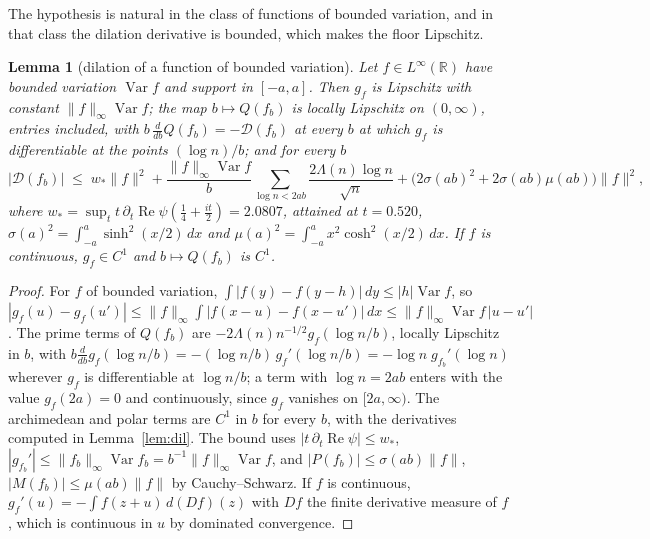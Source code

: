 \documentclass[11pt]{article}
\newtheorem{lemma}[theorem]{Lemma}
\theoremstyle{definition}
\theoremstyle{remark}
\newcommand{\R}{\mathbb{R}}
\DeclareMathOperator{\Ree}{Re}
\begin{document}
The hypothesis is natural in the class of functions of bounded variation, and in that class the dilation derivative is bounded, which makes the floor Lipschitz.

\begin{lemma}[dilation of a function of bounded variation]\label{lem:bv}
Let $f\in L^\infty(\R)$ have bounded variation $\operatorname{Var}f$ and support in $[-a,a]$. Then $g_f$ is Lipschitz with constant $\|f\|_\infty\operatorname{Var}f$; the map $b\mapsto Q(f_b)$ is locally Lipschitz on $(0,\infty)$, entries included, with $b\,\frac{d}{db}Q(f_b)=-\mathcal D(f_b)$ at every $b$ at which $g_f$ is differentiable at the points $(\log n)/b$; and for every $b$
\[
|\mathcal D(f_b)|\;\le\;w_*\|f\|^2+\frac{\|f\|_\infty\operatorname{Var}f}{b}\sum_{\log n<2ab}\frac{2\Lambda(n)\log n}{\sqrt n}+\big(2\sigma(ab)^2+2\sigma(ab)\mu(ab)\big)\|f\|^2,
\]
where $w_*=\sup_t t\,\partial_t\Ree\psi(\tfrac14+\tfrac{it}2)=2.0807$, attained at $t=0.520$, $\sigma(a)^2=\int_{-a}^a\sinh^2(x/2)\,dx$ and $\mu(a)^2=\int_{-a}^ax^2\cosh^2(x/2)\,dx$. If $f$ is continuous, $g_f\in C^1$ and $b\mapsto Q(f_b)$ is $C^1$.
\end{lemma}
\begin{proof}
For $f$ of bounded variation, $\int|f(y)-f(y-h)|\,dy\le|h|\operatorname{Var}f$, so $|g_f(u)-g_f(u')|\le\|f\|_\infty\int|f(x-u)-f(x-u')|\,dx\le\|f\|_\infty\operatorname{Var}f\,|u-u'|$. The prime terms of $Q(f_b)$ are $-2\Lambda(n)n^{-1/2}g_f(\log n/b)$, locally Lipschitz in $b$, with $b\frac{d}{db}g_f(\log n/b)=-(\log n/b)\,g_f'(\log n/b)=-\log n\;g_{f_b}'(\log n)$ wherever $g_f$ is differentiable at $\log n/b$; a term with $\log n=2ab$ enters with the value $g_f(2a)=0$ and continuously, since $g_f$ vanishes on $[2a,\infty)$. The archimedean and polar terms are $C^1$ in $b$ for every $b$, with the derivatives computed in Lemma~\ref{lem:dil}. The bound uses $|t\,\partial_t\Ree\psi|\le w_*$, $|g_{f_b}'|\le\|f_b\|_\infty\operatorname{Var}f_b=b^{-1}\|f\|_\infty\operatorname{Var}f$, and $|P(f_b)|\le\sigma(ab)\|f\|$, $|M(f_b)|\le\mu(ab)\|f\|$ by Cauchy--Schwarz. If $f$ is continuous, $g_f'(u)=-\int f(z+u)\,d(Df)(z)$ with $Df$ the finite derivative measure of $f$, which is continuous in $u$ by dominated convergence.
\end{proof}
\end{document}
